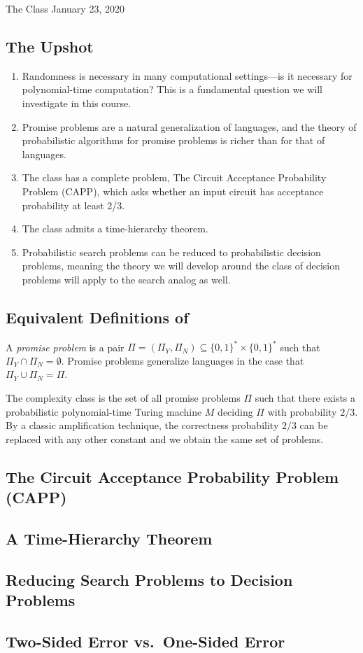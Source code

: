 \begin{lecture}{1}{The Class }{January 23, 2020}

\subsection*{The Upshot}

\begin{enumerate}
  \item Randomness is necessary in many computational settings---is it
    necessary for polynomial-time computation? This is a fundamental question
    we will investigate in this course.
  \item Promise problems are a natural generalization of languages, and the
    theory of probabilistic algorithms for promise problems is richer than
    for that of languages.
  \item The class  has a complete problem, The Circuit Acceptance
    Probability Problem (CAPP), which asks whether an input circuit has
    acceptance probability at least 2/3.
  \item The class  admits a time-hierarchy theorem.
  \item Probabilistic search problems can be reduced to probabilistic decision
    problems, meaning the theory we will develop around the class of decision
    problems  will apply to the search analog as well.
\end{enumerate}

\subsection{Equivalent Definitions of }

A \emph{promise problem} is a pair $\Pi = (\Pi_Y, \Pi_N) \subseteq \{0, 1\}^*
\times \{0, 1\}^*$ such that $\Pi_Y \cap \Pi_N = \emptyset$. Promise problems
generalize languages in the case that $\Pi_Y \cup \Pi_N = \Pi$.

The complexity class  is the set of all promise problems $\Pi$ such
that there exists a probabilistic polynomial-time Turing machine $M$ deciding
$\Pi$ with probability $2/3$. By a classic amplification technique, the
correctness probability $2/3$ can be replaced with any other constant and we
obtain the same set of problems.

\subsection{The Circuit Acceptance Probability Problem (CAPP)}

\subsection{A Time-Hierarchy Theorem}

\subsection{Reducing Search Problems to Decision Problems}

\subsection{Two-Sided Error vs.\ One-Sided Error}

\end{lecture}
